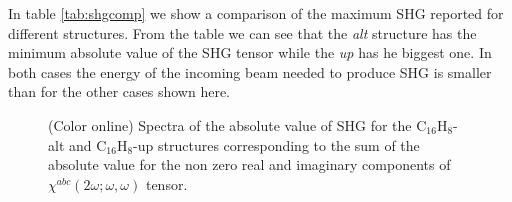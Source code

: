 \documentclass[pss]{wiley2sp} %
\begin{document}
In table \ref{tab:shgcomp} we show a comparison of the maximum SHG reported for different structures. From the table we can see that the \emph{alt} structure has the minimum absolute value of the SHG tensor while the \emph{up} has he biggest one. In both cases the energy of the incoming beam needed to produce SHG is smaller than for the other cases shown here.

\begin{figure}
\hfill
{}
\caption{(Color online) Spectra of the absolute value of SHG for the C$_{16}$H$_{8}$-alt 
    and C$_{16}$H$_{8}$-up structures corresponding to the sum of the absolute 
    value for the non zero real and imaginary components of $\chi^{abc}(2\omega;\omega,
    \omega) $ tensor.\label{fig:shg-abs-both}}
\end{figure}
\end{document}

